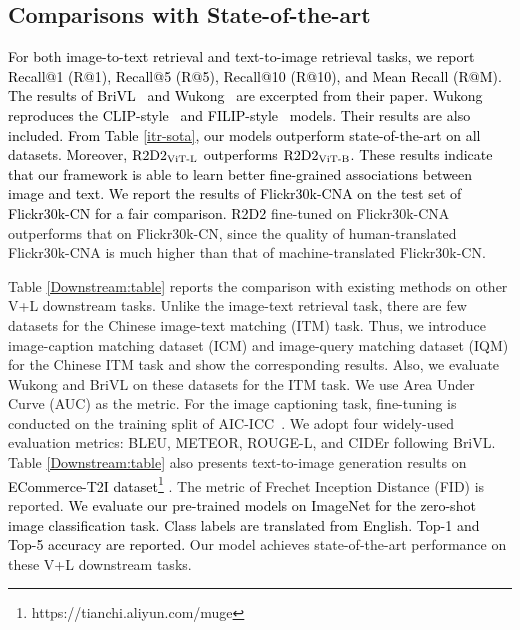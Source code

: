 \documentclass[sigconf]{acmart}
\def\jc{\textcolor{black}}
\def\xie{\textcolor{black}}
\def\blue{\textcolor{black}}
\def\ldw{\textcolor{black}}
\def\mmcr{\textcolor{black}}
\begin{document}
\subsection{Comparisons with State-of-the-art}\label{sec:SOTA}
\xie{For both image-to-text retrieval and text-to-image retrieval tasks, we report Recall@1 (R@1), Recall@5 (R@5), Recall@10 (R@10), and Mean Recall (R@M).
The results of BriVL~\cite{wenlan2} and Wukong~\cite{gu2022wukong} are excerpted from their paper. Wukong reproduces the CLIP-style~\cite{CLIP} and FILIP-style~\cite{filip} models.
\ldw{Their results are also included.}
From Table \ref{itr-sota}, our models outperform state-of-the-art on all datasets.
Moreover, $\text{\mmcr{R2D2}}_\text{ViT-L}$ outperforms $\text{\mmcr{R2D2}}_\text{ViT-B}$.}
\jc{These results indicate that our framework is able to learn better fine-grained associations between image and text.}
\jc{We report the results of Flickr30k-CNA on the test set of Flickr30k-CN for a fair comparison.} \mmcr{R2D2} fine-tuned on Flickr30k-CNA outperforms that on Flickr30k-CN, since the quality of human-translated Flickr30k-CNA is much higher than that of machine-translated Flickr30k-CN.
 

Table \ref{Downstream:table} reports the comparison with existing methods on other V+L downstream tasks. Unlike the image-text retrieval task, there are few datasets for the Chinese image-text matching (ITM) task. Thus, we introduce image-caption matching dataset (ICM) and image-query matching dataset (IQM) for the Chinese ITM task and show the corresponding results. 
Also, we evaluate Wukong and BriVL on these datasets for the ITM task.
We use Area Under Curve (AUC) as the metric. For the image captioning task, fine-tuning is conducted on the training split of AIC-ICC~\cite{aic}. We adopt four widely-used evaluation metrics: BLEU, METEOR, ROUGE-L, and CIDEr following BriVL. Table \ref{Downstream:table} also presents text-to-image generation results on \blue{ECommerce-T2I dataset\footnote{
https://tianchi.aliyun.com/muge} \cite{M6}}. The metric of Frechet Inception Distance (FID) is reported. \blue{We evaluate our pre-trained models on ImageNet\cite{imagenet} for the zero-shot image classification task. Class labels are translated from English. Top-1 and Top-5 accuracy are reported.}
Our model achieves state-of-the-art performance on these V+L downstream tasks. 
\end{document}
